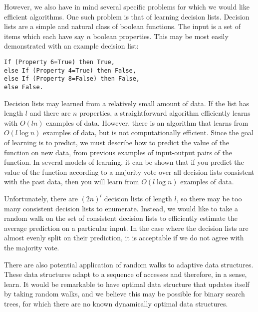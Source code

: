 However, we also have in mind several specific problems for which we would
like efficient algorithms.  One such problem is that of learning decision
lists.  Decision lists are a simple and natural class of boolean functions.
The input is a set of items which each have say $n$ boolean properties.  This
may be most easily demonstrated with an example decision list:
\begin{verbatim}
If (Property 6=True) then True,
else If (Property 4=True) then False,
else If (Property 8=False) then False,
else False.
\end{verbatim}
		
Decision lists may learned from a relatively small amount of data.  If the
list has length $l$ and there are $n$ properties, a straightforward algorithm
efficiently learns with $O(ln)$ examples of data.  However, there is an
algorithm that learns from $O(l \log n)$ examples of data, but is not
computationally efficient.  Since the goal of learning is to predict, we must
describe how to predict the value of the function on new data, from previous
examples of input-output pairs of the function.  In several models of
learning, it can be shown that if you predict the value of the function
according to a majority vote over all decision lists consistent with the past
data, then you will learn from $O(l \log n)$ examples of data. 

Unfortunately, there are $(2n)^l$ decision lists of length $l$, so there may
be too many consistent decision lists to enumerate.  Instead, we would like
to take a random walk on the set of consistent decision lists to efficiently
estimate the average prediction on a particular input.  In the case where the
decision lists are almost evenly split on their prediction, it is acceptable
if we do not agree with the majority vote.

There are also potential application of random walks to adaptive data
structures.  These data structures adapt to a sequence of accesses and
therefore, in a sense, learn.  It would be remarkable to have optimal data
structure that updates itself by taking random walks, and we believe this may
be possible for binary search trees, for which there are no known dynamically
optimal data structures.


